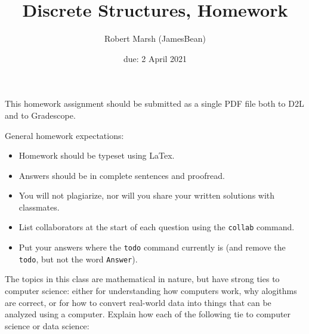 \documentclass{article}
\title{Discrete Structures, Homework \hwnum}
\author{Robert Marsh (JamesBean)}
\date{due: 2 April 2021}
\begin{document}
\maketitle

This homework assignment should be
submitted as a single PDF file both to D2L and to Gradescope.

General homework expectations:
\begin{itemize}
    \item Homework should be typeset using LaTex.
    \item Answers should be in complete sentences and proofread.
    \item You will not plagiarize, nor will you share your written solutions
        with classmates.
    \item List collaborators at the start of each question using the \texttt{collab} command.
    \item Put your answers where the \texttt{todo} command currently is (and
        remove the \texttt{todo}, but not the word \texttt{Answer}).
\end{itemize}


\collab{} 

The topics in this class are mathematical in nature, but have strong ties to
computer science: either for understanding how computers work, why alogithms are
correct, or for how to convert real-world data into things that can be analyzed
using a computer.  Explain how each of the following tie to computer science or
data science:
\end{document}
